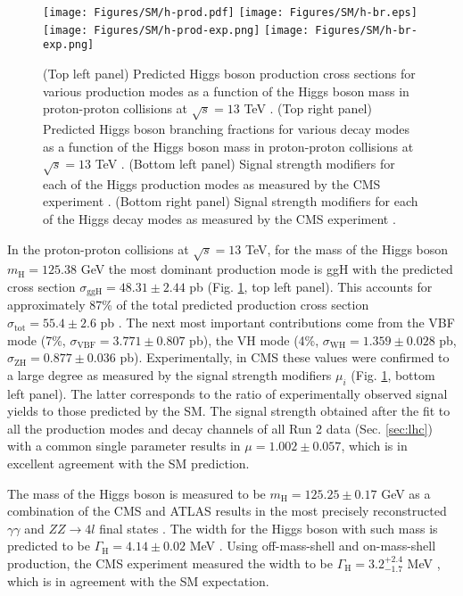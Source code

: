 \begin{figure}[!ht]
    \centering
    \texttt{[image: Figures/SM/h-prod.pdf]}
    \texttt{[image: Figures/SM/h-br.eps]}
    \texttt{[image: Figures/SM/h-prod-exp.png]}
    \texttt{[image: Figures/SM/h-br-exp.png]}
    \caption{(Top left panel) Predicted Higgs boson production cross sections for various production modes as a function of the Higgs boson mass in proton-proton collisions at $\sqrt{s} = 13$ TeV \cite{LHCHiggsCrossSectionWorkingGroup:2016ypw}. (Top right panel) Predicted Higgs boson branching fractions for various decay modes as a function of the Higgs boson mass in proton-proton collisions at $\sqrt{s} = 13$ TeV \cite{LHCHiggsCrossSectionWorkingGroup:2013rie}. (Bottom left panel) Signal strength modifiers for each of the Higgs production modes as measured by the CMS experiment \cite{CMS:2022dwd}. (Bottom right panel) Signal strength modifiers for each of the Higgs decay modes as measured by the CMS experiment \cite{CMS:2022dwd}.}
    \label{fig:h-prod}
\end{figure}

In the proton-proton collisions at $\sqrt{s}=13$ TeV, for the mass of the Higgs boson $m_\text{H} = 125.38$ GeV the most dominant production mode is ggH with the predicted cross section $\sigma_\text{ggH} = 48.31 \pm 2.44$ pb (Fig. \ref{fig:h-prod}, top left panel). This accounts for approximately 87\% of the total predicted production cross section $\sigma_\text{tot} = 55.4 \pm 2.6$ pb \cite{LHCHiggsCrossSectionWorkingGroup:2016ypw}. The next most important contributions come from the VBF mode (7\%, $\sigma_\text{VBF} = 3.771 \pm 0.807$ pb), the VH mode (4\%, $\sigma_\text{WH} = 1.359 \pm 0.028$ pb, $\sigma_\text{ZH} = 0.877 \pm 0.036$ pb). Experimentally, in CMS these values were confirmed to a large degree as measured by the signal strength modifiers $\mu_i$ (Fig. \ref{fig:h-prod}, bottom left panel). The latter corresponds to the ratio of experimentally observed signal yields to those predicted by the SM. The signal strength obtained after the fit to all the production modes and decay channels  of all Run 2 data (Sec. \ref{sec:lhc}) with a common single parameter results in $\mu = 1.002 \pm 0.057$, which is in excellent agreement with the SM prediction.

The mass of the Higgs boson is measured to be $m_\text{H} = 125.25 \pm 0.17$ GeV as a combination of the CMS and ATLAS results in the most precisely reconstructed $\gamma\gamma$ and $ZZ \to 4l$ final states \cite{ParticleDataGroup:2020ssz}. The width for the Higgs boson with such mass is predicted to be $\Gamma_\text{H} = 4.14 \pm 0.02$ MeV \cite{LHCHiggsCrossSectionWorkingGroup:2016ypw}. Using off-mass-shell and on-mass-shell production, the CMS experiment measured the width to be $\Gamma_\text{H} = 3.2^{+2.4}_{-1.7}$ MeV \cite{CMS:2022ley}, which is in agreement with the SM expectation. 

